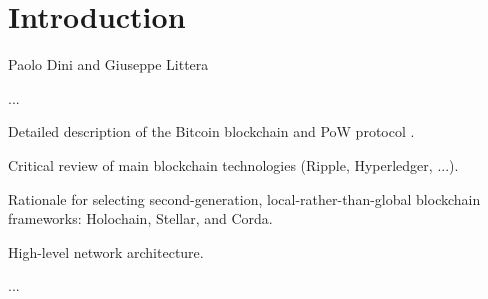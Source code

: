 \chapter{Introduction}
\label{ch:Introduction}

\vspace{-1cm}
\begin{center}
Paolo Dini and Giuseppe Littera
\end{center}


...

Detailed description of the Bitcoin blockchain and PoW protocol \cite{Antonopoulos2015}.

Critical review of main blockchain technologies (Ripple, Hyperledger, ...).

Rationale for selecting second-generation, local-rather-than-global blockchain frameworks: Holochain, Stellar, and Corda.

High-level network architecture.

...














\newpage











